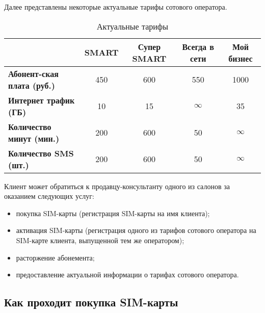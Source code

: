 Далее представлены некоторые актуальные тарифы сотового оператора.

\begin{table}[H]
    \label{tab:actual-tariffs}
    \caption{Актуальные тарифы}
    \setlength{\parskip}{1.0ex}
    \renewcommand{\arraystretch}{1.5}
    \renewcommand{\tabularxcolumn}[1]{m{#1}}
    \begin{tabularx}{\textwidth}{|X|C|C|C|C|}
        \hline
                                                  & \textbf{SMART} & \textbf{Супер SMART} & \textbf{Всегда в сети} & \textbf{Мой бизнес} \\ \hline
        \textbf{Абонент-ская плата (руб.)}        & 450            & 600                  & 550                    & 1000                \\ \hline
        \textbf{Интернет трафик (ГБ)}             & 10             & 15                   & $\infty$               & 35                  \\ \hline
        \textbf{Количество минут (мин.)}          & 200            & 600                  & 50                     & $\infty$            \\ \hline
        \textbf{Количество SMS (шт.)}             & 200            & 600                  & 50                     & $\infty$            \\ \hline
    \end{tabularx}
\end{table}


Клиент может обратиться к продавцу-консультанту одного из салонов за оказанием следующих услуг:
\begin{itemize}
    \item покупка SIM-карты (регистрация SIM-карты на имя клиента);
    \item активация SIM-карты (регистрация одного из тарифов сотового оператора на SIM-карте клиента, выпущенной тем же оператором);
    \item расторжение абонемента;
    \item предоставление актуальной информации о тарифах сотового оператора.
\end{itemize}


\subsection{Как проходит покупка SIM-карты}


